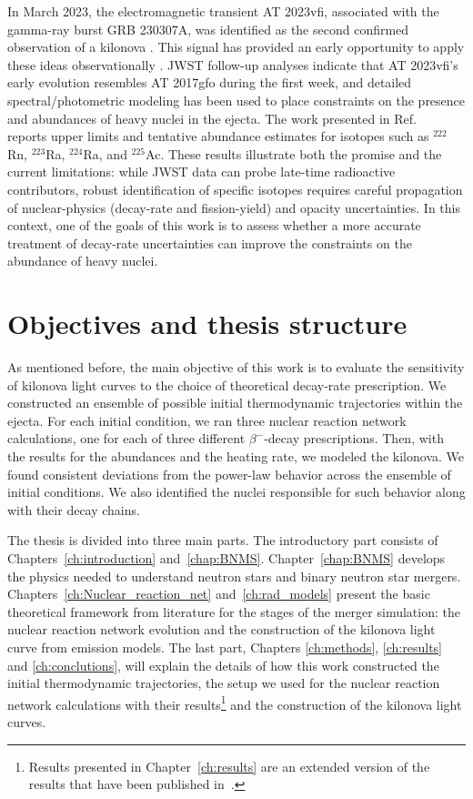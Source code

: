 In March 2023, the electromagnetic transient AT 2023vfi, associated with the gamma-ray burst GRB 230307A, was identified as the second confirmed observation of a kilonova \cite{levan_heavy-element_2024}.
This signal has provided an early opportunity to apply these ideas observationally \cite{gillanders_analysis_2025}.
JWST follow-up analyses indicate that AT 2023vfi’s early evolution resembles AT 2017gfo during the first week, and detailed spectral/photometric modeling has been used to place constraints on the presence and abundances of heavy nuclei in the ejecta.
The work presented in Ref.~\cite{liu_constraint_2025} reports upper limits and tentative abundance estimates for isotopes such as $^{222}$Rn, $^{223}$Ra, $^{224}$Ra, and $^{225}$Ac.
These results illustrate both the promise and the current limitations: while JWST data can probe late-time radioactive contributors, robust identification of specific isotopes requires careful propagation of nuclear-physics (decay-rate and fission-yield) and opacity uncertainties.
In this context, one of the goals of this work is to assess whether a more accurate treatment of decay-rate uncertainties can improve the constraints on the abundance of heavy nuclei.

\section{Objectives and thesis structure}

As mentioned before, the main objective of this work is to evaluate the sensitivity of kilonova light curves to the choice of theoretical decay-rate prescription.
We constructed an ensemble of possible initial thermodynamic trajectories within the ejecta.
For each initial condition, we ran three nuclear reaction network calculations, one for each of three different $\beta^{-}$-decay prescriptions.
Then, with the results for the abundances and the heating rate, we modeled the kilonova.
We found consistent deviations from the power-law behavior across the ensemble of initial conditions.
We also identified the nuclei responsible for such behavior along with their decay chains.

The thesis is divided into three main parts.
The introductory part consists of Chapters~\ref{ch:introduction} and~\ref{chap:BNMS}.
Chapter~\ref{chap:BNMS} develops the physics needed to understand neutron stars and binary neutron star mergers. 
Chapters~\ref{ch:Nuclear_reaction_net} and~\ref{ch:rad_models} present the basic theoretical framework from literature for the stages of the merger simulation: the nuclear reaction network evolution and the construction of the kilonova light curve from emission models. 
The last part, Chapters \ref{ch:methods}, \ref{ch:results} and \ref{ch:conclutions}, will explain the details of how this work constructed the initial thermodynamic trajectories, the setup we used for the nuclear reaction network calculations with their results\footnote{Results presented in Chapter~\ref{ch:results} are an extended version of the results that have been published in~\cite{hernandez_porras_features_2027}.} and the construction of the kilonova light curves.